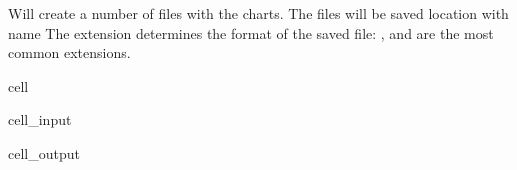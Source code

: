 \documentclass[letterpaper,10pt,english]{jupyterBook}
\begin{document}
\sphinxAtStartPar
{}
Will create a number of files with the charts.
The files will be saved location with name  The extension determines the
format of the saved file: ,  and  are the most common extensions.

\begin{sphinxuseclass}{cell}\begin{sphinxVerbatimInput}

\begin{sphinxuseclass}{cell_input}
\begin{sphinxVerbatim}[commandchars=\\\{\}]
\end{sphinxVerbatim}

\end{sphinxuseclass}\end{sphinxVerbatimInput}
\begin{sphinxVerbatimOutput}

\begin{sphinxuseclass}{cell_output}
\begin{sphinxVerbatim}[commandchars=\\\{\}]
[]
\end{sphinxVerbatim}

\end{sphinxuseclass}\end{sphinxVerbatimOutput}

\end{sphinxuseclass}
\end{document}
